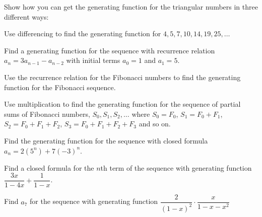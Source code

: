 \documentclass[10pt]{exam}
\begin{document}
\begin{questions}


\question Show how you can get the generating function for the triangular numbers in three different ways:

\question Use differencing to find the generating function for $4, 5, 7, 10, 14, 19, 25, \ldots$

\question Find a generating function for the sequence with recurrence relation $a_n = 3a_{n-1} - a_{n-2}$ with initial terms $a_0 = 1$ and $a_1 = 5$.

\question Use the recurrence relation for the Fibonacci numbers to find the generating function for the Fibonacci sequence.

\question Use multiplication to find the generating function for the sequence of partial sums of Fibonacci numbers, $S_0, S_1, S_2, \ldots$ where $S_0 = F_0$, $S_1 = F_0 + F_1$, $S_2 = F_0 + F_1 + F_2$, $S_3 = F_0 + F_1 + F_2 + F_3$ and so on.

\question Find the generating function for the sequence with closed formula $a_n = 2(5^n) + 7(-3)^n$.

\question Find a closed formula for the $n$th term of the sequence with generating function $\dfrac{3x}{1-4x} + \dfrac{1}{1-x}$.

\question Find $a_7$ for the sequence with generating function $\dfrac{2}{(1-x)^2}\cdot\dfrac{x}{1-x-x^2}$
\end{questions}
\end{document}
